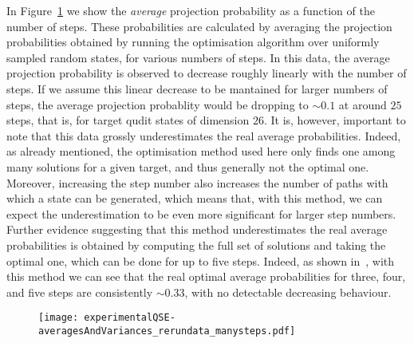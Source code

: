In Figure~\ref{fig:avgProbabilitiesVsStepNumber} we show the \textit{average} projection probability as a function of the number of steps. These probabilities are calculated by averaging the projection probabilities obtained by running the optimisation algorithm over uniformly sampled random states, for various numbers of steps. In this data, the average projection probability is observed to decrease roughly linearly with the number of steps. If we assume this linear decrease to be mantained for larger numbers of steps, the average projection probablity would be dropping to $\sim 0.1$ at around $25$ steps, that is, for target qudit states of dimension $26$.
It is, however, important to note that this data grossly underestimates the real average probabilities. Indeed, as already mentioned, the optimisation method used here only finds one among many solutions for a given target, and thus generally not the optimal one. Moreover, increasing the step number also increases the number of paths with which a state can be generated, which means that, with this method, we can expect the underestimation to be even more significant for larger step numbers.
Further evidence suggesting that this method underestimates the real average probabilities is obtained by computing the full set of solutions and taking the optimal one, which can be done for up to five steps. Indeed, as shown in~\cite{innocenti2017quantum}, with this method we can see that the real optimal average probabilities for three, four, and five steps are consistently $\sim 0.33$, with no detectable decreasing behaviour.
\begin{figure}[ht!]
    \centering
    \texttt{[image: experimentalQSE-averagesAndVariances\_rerundata\_manysteps.pdf]}
    \caption{}
    \label{fig:avgProbabilitiesVsStepNumber}
\end{figure}




\vspace{1em}
